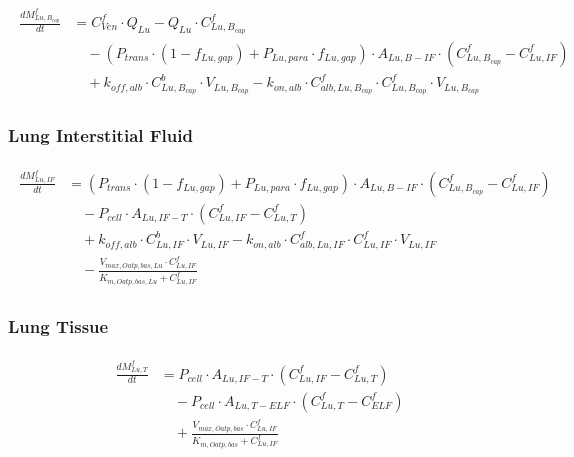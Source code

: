\documentclass[preprint,12pt,authoryear]{elsarticle}
\begin{document}
\begin{align}
\begin{aligned}
\frac{dM_{Lu,B_{cap}}^f}{dt} &= C_{Ven}^f \cdot Q_{Lu}
- Q_{Lu} \cdot C_{Lu,B_{cap}}^f \\
& \quad - (P_{trans}\cdot  (1-f_{Lu,gap}) + P_{Lu,para} \cdot f_{Lu,gap}) \cdot A_{Lu,B-IF} \cdot (C_{Lu,B_{cap}}^f - C_{Lu,IF}^f) \\
& \quad + k_{off,alb} \cdot C_{Lu,B_{cap}}^b \cdot V_{Lu,B_{cap}}
- k_{on,alb} \cdot C_{alb,Lu,B_{cap}}^f \cdot C_{Lu,B_{cap}}^f \cdot V_{Lu,B_{cap}}
\end{aligned}
\label{eq:PFOA_lung_blood}
\end{align}

\subsubsection{Lung Interstitial Fluid}

\begin{align}
\begin{aligned}
\frac{dM_{Lu,IF}^f}{dt} &=  (P_{trans}\cdot  (1-f_{Lu,gap}) + P_{Lu,para} \cdot f_{Lu,gap}) \cdot A_{Lu,B-IF} \cdot (C_{Lu,B_{cap}}^f - C_{Lu,IF}^f) \\
& \quad - P_{cell} \cdot A_{Lu,IF-T} \cdot (C_{Lu,IF}^f - C_{Lu,T}^f ) \\
& \quad + k_{off,alb} \cdot C_{Lu,IF}^b \cdot V_{Lu,IF}
- k_{on,alb} \cdot C_{alb,Lu,IF}^f \cdot C_{Lu,IF}^f \cdot V_{Lu,IF} \\
& \quad - \frac{V_{max,Oatp,bas,Lu} \cdot C_{Lu,IF}^f}{K_{m,Oatp,bas,Lu} + C_{Lu,IF}^f}
\end{aligned}
\label{eq:PFOA_lung_interstitial}
\end{align}

\subsubsection{Lung Tissue}

\begin{align}
\begin{aligned}
\frac{dM_{Lu,T}^f}{dt} &= P_{cell} \cdot A_{Lu,IF-T} \cdot (C_{Lu,IF}^f - C_{Lu,T}^f )\\
& \quad - P_{cell} \cdot A_{Lu,T-ELF} \cdot (C_{Lu,T}^f - C_{ELF}^f) \\
& \quad + \frac{V_{max,Oatp,bas} \cdot C_{Lu,IF}^f}{K_{m,Oatp,bas} + C_{Lu,IF}^f}
\end{aligned}
\label{eq:PFOA_lung_tissue}
\end{align}
\end{document}

